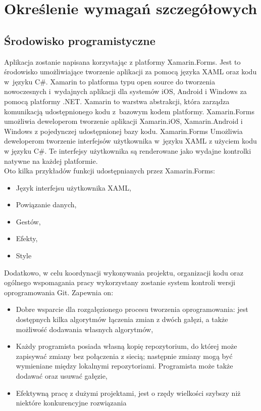\newpage
\section{Określenie wymagań szczegółowych}		%

\subsection{Środowisko programistyczne}  %

\hspace{0.60cm}Aplikacja zostanie napisana korzystając z platformy Xamarin.Forms. Jest to środowisko umożliwiające tworzenie aplikacji za pomocą języka XAML oraz kodu w~języku C\#.
Xamarin to platforma typu open source do tworzenia nowoczesnych i~wydajnych aplikacji dla systemów iOS, Android i Windows za pomocą platformy .NET. Xamarin to warstwa abstrakcji, która zarządza komunikacją udostępnionego kodu z~bazowym kodem platformy. Xamarin.Forms umożliwia deweloperom tworzenie aplikacji Xamarin.iOS, Xamarin.Android i Windows z pojedynczej udostępnionej bazy kodu. Xamarin.Forms Umożliwia deweloperom tworzenie interfejsów użytkownika w~języku XAML z użyciem kodu w języku C\#. Te interfejsy użytkownika są renderowane jako wydajne kontrolki natywne na każdej platformie. \\ Oto kilka przykładów funkcji udostępnianych przez Xamarin.Forms:

\begin{itemize}
	\item Język interfejsu użytkownika XAML,
	\item Powiązanie danych,
	\item Gestów,
	\item Efekty,
	\item Style
\end{itemize}

Dodatkowo, w celu koordynacji wykonywania projektu, organizacji kodu oraz ogólnego wspomagania pracy wykorzystany zostanie system kontroli wersji oprogramowania Git. Zapewnia on:

\begin{itemize}
	\item Dobre wsparcie dla rozgałęzionego procesu tworzenia oprogramowania: jest dostępnych kilka algorytmów łączenia zmian z dwóch gałęzi, a także możliwość dodawania własnych algorytmów,
	\item Każdy programista posiada własną kopię repozytorium, do której może zapisywać zmiany bez połączenia z siecią; następnie zmiany mogą być wymieniane między lokalnymi repozytoriami. Programista może także dodawać oraz usuwać gałęzie, 
	\item Efektywną pracę z dużymi projektami, jest o rzędy wielkości szybszy niż niektóre konkurencyjne rozwiązania
\end{itemize}

